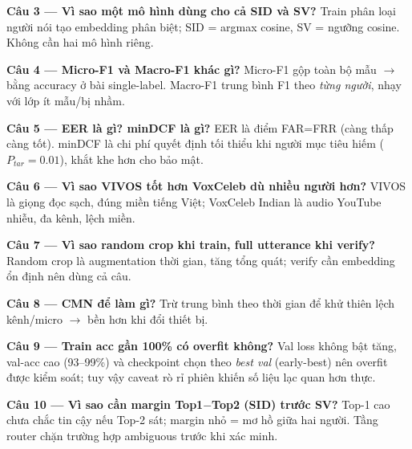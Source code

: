 \documentclass[12pt,a4paper]{article}
\begin{document}
\textbf{Câu 3 --- Vì sao một mô hình dùng cho cả SID và SV?} Train phân loại người
nói tạo embedding phân biệt; SID = argmax cosine, SV = ngưỡng cosine. Không cần hai
mô hình riêng.

\textbf{Câu 4 --- Micro-F1 và Macro-F1 khác gì?} Micro-F1 gộp toàn bộ mẫu $\to$ bằng
accuracy ở bài single-label. Macro-F1 trung bình F1 theo \emph{từng người}, nhạy với
lớp ít mẫu/bị nhầm.

\textbf{Câu 5 --- EER là gì? minDCF là gì?} EER là điểm FAR=FRR (càng thấp càng tốt).
minDCF là chi phí quyết định tối thiểu khi người mục tiêu hiếm ($P_{tar}=0.01$),
khắt khe hơn cho bảo mật.

\textbf{Câu 6 --- Vì sao VIVOS tốt hơn VoxCeleb dù nhiều người hơn?} VIVOS là giọng
đọc sạch, đúng miền tiếng Việt; VoxCeleb Indian là audio YouTube nhiễu, đa kênh, lệch
miền.

\textbf{Câu 7 --- Vì sao random crop khi train, full utterance khi verify?} Random
crop là augmentation thời gian, tăng tổng quát; verify cần embedding ổn định nên
dùng cả câu.

\textbf{Câu 8 --- CMN để làm gì?} Trừ trung bình theo thời gian để khử thiên lệch
kênh/micro $\to$ bền hơn khi đổi thiết bị.

\textbf{Câu 9 --- Train acc gần 100\% có overfit không?} Val loss không bật tăng,
val-acc cao (93--99\%) và checkpoint chọn theo \emph{best val} (early-best) nên
overfit được kiểm soát; tuy vậy caveat rò rỉ phiên khiến số liệu lạc quan hơn thực.

\textbf{Câu 10 --- Vì sao cần margin Top1$-$Top2 (SID) trước SV?} Top-1 cao chưa chắc
tin cậy nếu Top-2 sát; margin nhỏ = mơ hồ giữa hai người. Tầng router chặn trường hợp
ambiguous trước khi xác minh.

\end{document}
